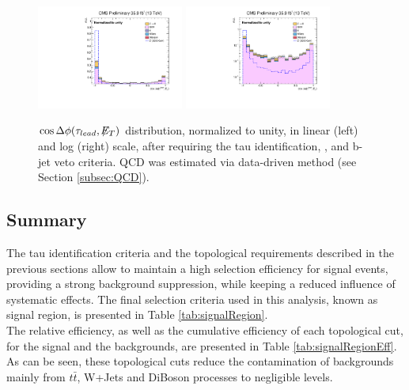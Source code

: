  \begin{figure}[H]
 \begin{center}
 \captionsetup[subfloat]{farskip=0pt,captionskip=0.0cm,labelformat=empty}
 \includegraphics[clip,width=0.43\textwidth]{figuras/Chapter5/TauID_Plots/EventSelection_cosDphiTauMET.pdf}
 \includegraphics[clip,width=0.43\textwidth]{figuras/Chapter5/TauID_Plots/EventSelection_cosDphiTauMET_log.pdf}
 \end{center}
 \caption{$\cos\Delta \phi (\tau_{lead},\not\!\!E_T)$ distribution, normalized to unity, in linear (left) and log (right) scale, after requiring
 the tau identification, \MET, and b-jet veto criteria. QCD was estimated via data-driven method (see Section \ref{subsec:QCD}).}
 \label{cosDphiTauMET}
 \end{figure}
 


\subsection{Summary}
\label{subsec:SignalRegion}

\noindent The tau identification criteria and the topological requirements described 
in the previous sections allow to maintain a high selection efficiency 
for signal events, providing a strong background suppression, while 
keeping a reduced influence of systematic effects. The final selection 
criteria used in this analysis, known as signal region, is presented in 
Table \ref{tab:signalRegion}.\\

\noindent The relative efficiency, as well as the cumulative efficiency
of each topological cut, for the signal and the backgrounds,
are presented in Table \ref{tab:signalRegionEff}. As can be seen, 
these topological cuts reduce the contamination of backgrounds mainly from
$t\bar{t}$, W+Jets and DiBoson processes to negligible levels.\\

